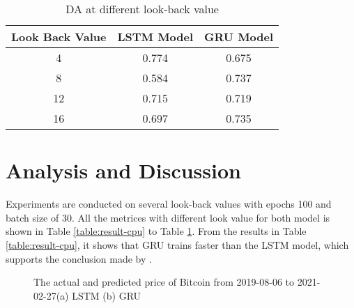 \begin{table}[h]
	\captionsetup{justification=centering}
	\caption{DA at different look-back value }
	\centering
	\begin{tabular}{ c  c  c }
		\hline\hline
		Look Back Value & LSTM Model & GRU Model \\ 
		\hline
		4 & 0.774  & 0.675\\
		8 & 0.584 &  0.737\\
		12 & 0.715 & 0.719\\
		16 & 0.697 & 0.735 \\
		\hline
	\end{tabular} 
	\label{table:result-da}
\end{table}

\section{Analysis and Discussion}
Experiments are conducted on several look-back values with epochs 100 and batch size of 30. All the metrices with different look value for both model is shown in Table \ref{table:result-cpu} to Table \ref{table:result-da}. From the results in Table \ref{table:result-cpu}, it shows that GRU trains faster than the LSTM model, which supports the conclusion made by \cite{eric2019}.


 
\begin{figure}[h]
	\centering
	\caption{The actual and predicted price of Bitcoin from 2019-08-06 to 2021-02-27(a) LSTM (b) GRU}
	\label{fig:prediction}
\end{figure}
